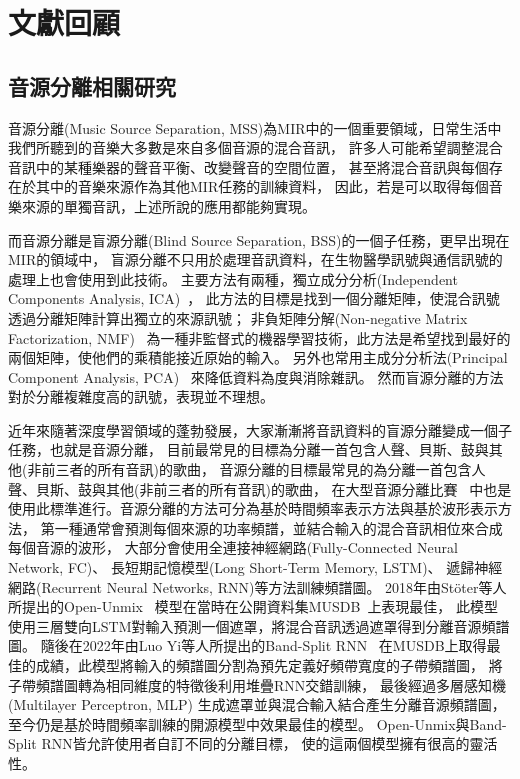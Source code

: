 \documentclass[class=NCU_thesis, crop=false]{standalone}
\begin{document}
\pagebreak

\section{文獻回顧}
\subsection{音源分離相關研究}
音源分離(Music Source Separation, MSS)為MIR中的一個重要領域，日常生活中我們所聽到的音樂大多數是來自多個音源的混合音訊，
許多人可能希望調整混合音訊中的某種樂器的聲音平衡、改變聲音的空間位置，
甚至將混合音訊與每個存在於其中的音樂來源作為其他MIR任務的訓練資料，
因此，若是可以取得每個音樂來源的單獨音訊，上述所說的應用都能夠實現。

而音源分離是盲源分離(Blind Source Separation, BSS)的一個子任務，更早出現在MIR的領域中，
盲源分離不只用於處理音訊資料，在生物醫學訊號與通信訊號的處理上也會使用到此技術。
主要方法有兩種，獨立成分分析(Independent Components Analysis, ICA)~\cite{comon1994independent}，
此方法的目標是找到一個分離矩陣，使混合訊號透過分離矩陣計算出獨立的來源訊號；
非負矩陣分解(Non-negative Matrix Factorization, NMF)~\cite{lee2000algorithms}
為一種非監督式的機器學習技術，此方法是希望找到最好的兩個矩陣，使他們的乘積能接近原始的輸入。
另外也常用主成分分析法(Principal Component Analysis, PCA)~\cite{mackiewicz1993principal}
來降低資料為度與消除雜訊。
然而盲源分離的方法對於分離複雜度高的訊號，表現並不理想。

近年來隨著深度學習領域的蓬勃發展，大家漸漸將音訊資料的盲源分離變成一個子任務，也就是音源分離，
目前最常見的目標為分離一首包含人聲、貝斯、鼓與其他(非前三者的所有音訊)的歌曲，
音源分離的目標最常見的為分離一首包含人聲、貝斯、鼓與其他(非前三者的所有音訊)的歌曲，
在大型音源分離比賽~\cite{Yuki_Mitsufuji2021MusicDemixing, Fabbro_Giorgio2023TheSoundDemixing}
中也是使用此標準進行。音源分離的方法可分為基於時間頻率表示方法與基於波形表示方法，
第一種通常會預測每個來源的功率頻譜，並結合輸入的混合音訊相位來合成每個音源的波形，
大部分會使用全連接神經網路(Fully-Connected Neural Network, FC)、
長短期記憶模型(Long Short-Term Memory, LSTM)、
遞歸神經網路(Recurrent Neural Networks, RNN)等方法訓練頻譜圖。
2018年由Stöter等人所提出的Open-Unmix~\cite{FabianRobert_Stöter2019OpenUnmix}
模型在當時在公開資料集MUSDB~\cite{Rafii2017musdb18}上表現最佳，
此模型使用三層雙向LSTM對輸入預測一個遮罩，將混合音訊透過遮罩得到分離音源頻譜圖。
隨後在2022年由Luo Yi等人所提出的Band-Split RNN~\cite{Luo_Yi2022MusicSourceSeparation}
在MUSDB上取得最佳的成績，此模型將輸入的頻譜圖分割為預先定義好頻帶寬度的子帶頻譜圖，
將子帶頻譜圖轉為相同維度的特徵後利用堆疊RNN交錯訓練，
最後經過多層感知機(Multilayer Perceptron, MLP)
生成遮罩並與混合輸入結合產生分離音源頻譜圖，
至今仍是基於時間頻率訓練的開源模型中效果最佳的模型。
Open-Unmix與Band-Split RNN皆允許使用者自訂不同的分離目標，
使的這兩個模型擁有很高的靈活性。
\end{document}
